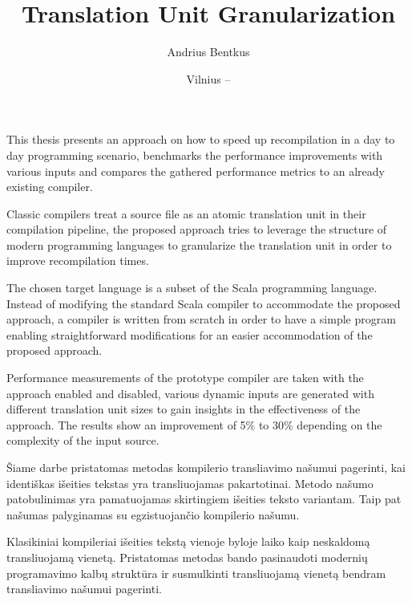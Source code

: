\documentclass{VUMIFPSbakalaurinis}
\institute{Informatikos institutas}  %
\title{Translation Unit Granularization}
\author{Andrius Bentkus}
\date{Vilnius – \the\year}
\begin{document}
\maketitle


\addtocounter{page}{1}

This thesis presents an approach on how to speed up recompilation in a day to day programming scenario, benchmarks the performance improvements with various inputs and compares the gathered performance metrics to an already existing compiler.

Classic compilers treat a source file as an atomic translation unit in their compilation pipeline, the proposed approach tries to leverage the structure of modern programming languages to granularize the translation unit in order to improve recompilation times.

The chosen target language is a subset of the Scala programming language.
Instead of modifying the standard Scala compiler to accommodate the proposed approach, a compiler is written from scratch in order to have a simple program enabling straightforward modifications for an easier accommodation of the proposed approach.

Performance measurements of the prototype compiler are taken with the approach enabled and disabled, various dynamic inputs are generated with different translation unit sizes to gain insights in the effectiveness of the approach. The results show an improvement of 5\% to 30\% depending on the complexity of the input source.



Šiame darbe pristatomas metodas kompilerio transliavimo našumui pagerinti, kai identiškas išeities tekstas yra transliuojamas pakartotinai.
Metodo našumo patobulinimas yra pamatuojamas skirtingiem išeities teksto variantam.
Taip pat našumas palyginamas su egzistuojančio kompilerio našumu.

Klasikiniai kompileriai išeities tekstą vienoje byloje laiko kaip neskaldomą transliuojamą vienetą.
Pristatomas metodas bando pasinaudoti modernių programavimo kalbų struktūra ir susmulkinti transliuojamą vienetą bendram transliavimo našumui pagerinti.
\end{document}

